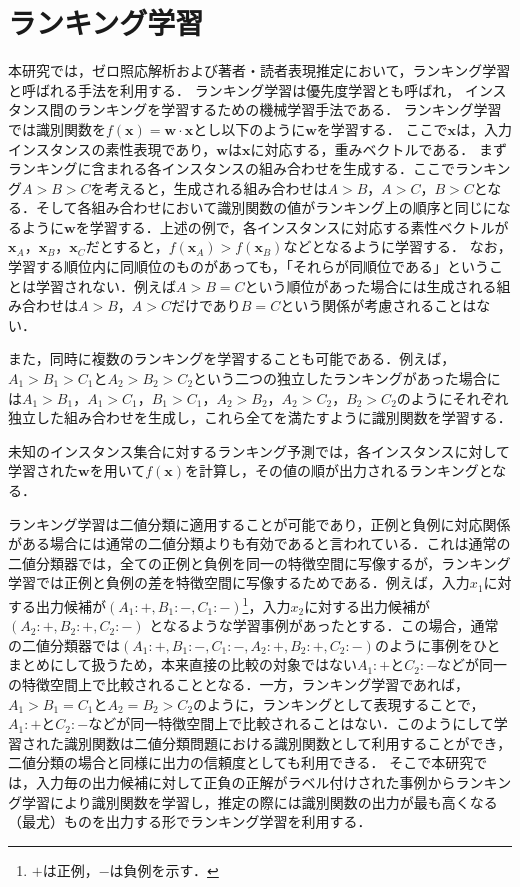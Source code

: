 \documentclass[japanese]{jnlp_1.4}
\begin{document}
\section{ランキング学習}
\label{114801_18Jun13}

本研究では，ゼロ照応解析および著者・読者表現推定において，ランキング学習と呼ばれる手法を利用する．
ランキング学習は優先度学習とも呼ばれ，
インスタンス間のランキングを学習するための機械学習手法である\cite{herbrich1998learning,joachims2002optimizing}．
ランキング学習では識別関数を$f(\mathbf{x}) = \mathbf{w}\cdot \mathbf{x}$とし以下のように$\mathbf{w}$を学習する．
ここで$\mathbf{x}$は，入力インスタンスの素性表現であり，$\mathbf{w}$は$\mathbf{x}$に対応する，重みベクトルである．
まずランキングに含まれる各インスタンスの組み合わせを生成する．ここでランキング$A > B > C$を考えると，生成される組み合わせは$A > B$，$A > C$，$B > C$となる．そして各組み合わせにおいて識別関数の値がランキング上の順序と同じになるように$\mathbf{w}$を学習する．上述の例で，各インスタンスに対応する素性ベクトルが$\mathbf{x}_A$，$\mathbf{x}_B$，$\mathbf{x}_C$だとすると，$f(\mathbf{x}_A) > f(\mathbf{x}_B)$などとなるように学習する．
なお，学習する順位内に同順位のものがあっても，「それらが同順位である」ということは学習されない．例えば$A > B = C$という順位があった場合には生成される組み合わせは$A > B$，$A > C$だけであり$B = C$という関係が考慮されることはない．

また，同時に複数のランキングを学習することも可能である．例えば，$A_1 > B_1 > C_1$と$A_2 > B_2 > C_2$という二つの独立したランキングがあった場合には$A_1 > B_1$，$A_1 > C_1$，$B_1 > C_1$，$A_2 > B_2$，$A_2 > C_2$，$B_2 > C_2$のようにそれぞれ独立した組み合わせを生成し，これら全てを満たすように識別関数を学習する．

未知のインスタンス集合に対するランキング予測では，各インスタンスに対して学習された$\mathbf{w}$を用いて$f(\mathbf{x})$を計算し，その値の順が出力されるランキングとなる．

ランキング学習は二値分類に適用することが可能であり，正例と負例に対応関係がある場合には通常の二値分類よりも有効であると言われている\cite{磯崎秀樹:2006-07-15}．これは通常の二値分類器では，全ての正例と負例を同一の特徴空間に写像するが，ランキング学習では正例と負例の差を特徴空間に写像するためである．例えば，入力$x_1$に対する出力候補が$(A_1\colon +, B_1\colon -, C_1\colon -)$\footnote{$+$は正例，$-$は負例を示す．}，入力$x_2$に対する出力候補が$(A_2\colon +, B_2\colon +, C_2\colon -)$
となるような学習事例があったとする．この場合，通常の二値分類器では$(A_1\colon +, B_1\colon -, C_1\colon -,A_2\colon +, B_2\colon +, C_2\colon -)$のように事例をひとまとめにして扱うため，本来直接の比較の対象ではない$A_1\colon +$と$C_2\colon -$などが同一の特徴空間上で比較されることとなる．一方，ランキング学習であれば，$A_1 > B_1 = C_1$と$A_2 = B_2 > C_2$のように，ランキングとして表現することで，$A_1\colon +$と$C_2\colon -$などが同一特徴空間上で比較されることはない．このようにして学習された識別関数は二値分類問題における識別関数として利用することができ，二値分類の場合と同様に出力の信頼度としても利用できる．
そこで本研究では，入力毎の出力候補に対して正負の正解がラベル付けされた事例からランキング学習により識別関数を学習し，推定の際には識別関数の出力が最も高くなる（最尤）ものを出力する形でランキング学習を利用する．
\end{document}
